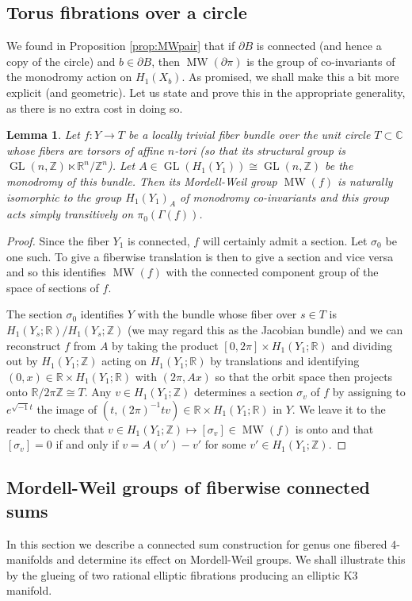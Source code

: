 \documentclass[10pt,letterpaper]{amsart}
\numberwithin{equation}{section}
\def\CC{{\mathbb C}}
\def\RR{{\mathbb R}}
\def\ZZ{{\mathbb Z}}
\def\G{\Gamma}
\newcommand{\p}{\partial}
\newcommand\MW{\operatorname{MW}}
\newcommand\GL{\operatorname{GL}}
\newtheorem{lemma}[theorem]{Lemma}
\theoremstyle{remark}
\begin{document}
\subsection{Torus fibrations over a circle} 
We found in Proposition \ref{prop:MWpair} that if $\p B$  is connected (and hence a copy of the circle) and $b\in \p B$,  then $\MW(\p \pi)$ is the group of co-invariants of the monodromy action on $H_1(X_b)$.  As promised, we shall make this a bit more explicit (and geometric). Let us state and prove  this in the appropriate generality, as there is no extra cost in doing so.

\begin{lemma}\label{lemma:MWcircle}
Let $f: Y\to T$ be a locally trivial  fiber bundle over the unit circle  $T\subset \CC$ whose fibers are torsors of  affine $n$-tori (so that its structural group is $\GL(n, \ZZ)\ltimes \RR^n/\ZZ^n$). Let $A\in\GL(H_1(Y_1))\cong \GL(n, \ZZ)$ be the monodromy of this bundle. Then its Mordell-Weil group $\MW (f)$ is naturally isomorphic to the group $H_1(Y_1)_A$ of monodromy  co-invariants and this group acts simply transitively on $\pi_0(\G(f))$. 
\end{lemma}
\begin{proof}
Since the fiber $Y_1$ is connected, $f$ will certainly admit a section. Let $\sigma_0$ be one such. To give a fiberwise translation is then to give a section and vice versa and so this identifies $\MW (f)$ with the connected component group of the space of sections of $f$.

The section $\sigma_0$ identifies
$Y$ with the bundle whose fiber over $s\in T$ is $H_1(Y_s;\RR)/H_1(Y_s;\ZZ)$  (we may regard this as the Jacobian bundle)
and  we  can reconstruct $f$ from $A$ by taking the product $[0,2\pi]\times H_1(Y_1;\RR)$ and  dividing out by $H_1(Y_1;\ZZ)$ acting on $H_1(Y_1;\RR)$ by translations and identifying  $(0, x)\in\RR\times H_1(Y_1;\RR)$ with  $(2\pi, Ax)$ so that the orbit space  then projects onto $\RR/2\pi\ZZ\cong T$.  Any $v\in H_1(Y_1;\ZZ)$ determines a section $\sigma_v$ of $f$ by assigning to $e^{\sqrt{-1}t}$ the image of 
$(t, (2\pi)^{-1}t v)\in \RR\times H_1(Y_1;\RR)$  in $Y$. We leave it to the reader to check that $v\in  H_1(Y_1;\ZZ) \mapsto [\sigma_v]\in \MW(f)$ is onto and that $[\sigma_v]=0$ if and only if $v=A(v')-v'$ for some $v'\in H_1(Y_1;\ZZ)$. 
\end{proof}

\subsection{Mordell-Weil groups of fiberwise connected sums}\label{subsection:fibsum}
In this section we describe a connected sum construction for genus one fibered 4-manifolds  and determine its effect on Mordell-Weil groups. We shall illustrate this by the glueing of two rational elliptic fibrations producing an elliptic K3 manifold.
\end{document}
